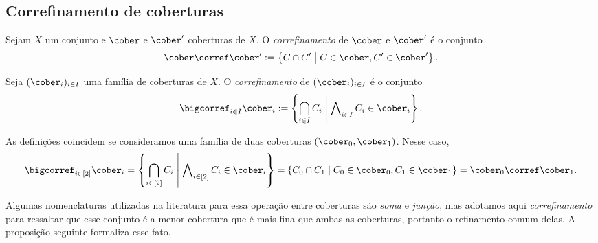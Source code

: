 \subsection{Correfinamento de coberturas}


\begin{definition}
Sejam $X$ um conjunto e $\cober$ e $\cober'$ coberturas de $X$. O \emph{correfinamento} de $\cober$ e $\cober'$ é o conjunto
	\begin{equation*}
	\cober \corref \cober' := \set{C \cap C'}{C \in \cober, C' \in \cober'}.
	\end{equation*}
	
Seja $(\cober_i)_{i \in I}$ uma família de coberturas de $X$. O \emph{correfinamento} de $(\cober_i)_{i \in I}$ é o conjunto
	\begin{equation*}
	\bigcorref_{i \in I} \cober_i := \set{\bigcap_{i \in I} C_i}{\forall_{i \in I} C_i \in \cober_i}.
	\end{equation*}
\end{definition}

As definições coincidem se consideramos uma família de duas coberturas $(\cober_0, \cober_1)$. Nesse caso,
	\begin{equation*}
	\bigcorref_{i \in [2]} \cober_i = \set{\bigcap_{i \in [2]} C_i}{\forall_{i \in [2]} C_i \in \cober_i} = \set{C_0 \cap C_1}{C_0 \in \cober_0, C_1 \in \cober_1} = \cober_0 \corref \cober_1.
	\end{equation*}

Algumas nomenclaturas utilizadas na literatura para essa operação entre coberturas são \textit{soma} e \textit{junção}, mas adotamos aqui \textit{correfinamento} para ressaltar que esse conjunto é a menor cobertura que é mais fina que ambas as coberturas, portanto o refinamento comum delas. A proposição seguinte formaliza esse fato.

